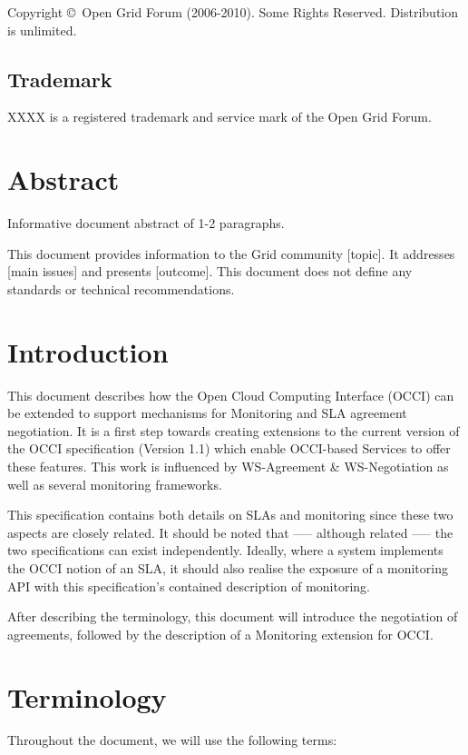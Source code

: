 \documentclass[12pt]{article}  %
\newcommand{\copyrightyears}{2006-2010}  %
\begin{document}
Copyright \copyright \ Open Grid Forum (\copyrightyears).  Some Rights Reserved.  
Distribution is unlimited.

\subsection*{Trademark}

XXXX is a registered trademark and service mark of the Open Grid Forum. 

\section*{Abstract}

Informative document abstract of 1-2 paragraphs.

This document provides information to the Grid community [topic].
It addresses [main issues] and presents [outcome].
This document does not define any standards or technical recommendations.

\tableofcontents

\newpage


\section{Introduction}
This document describes how the Open Cloud Computing Interface (OCCI) can be extended to support mechanisms for Monitoring and SLA agreement negotiation. It is a first step towards creating extensions to the current version of the OCCI specification (Version 1.1) which enable OCCI-based Services to offer these features. This work is influenced by WS-Agreement \& WS-Negotiation as well as several monitoring frameworks.


This specification contains both details on SLAs and monitoring since these two aspects are closely related. It should be noted that —-- although related —-- the two specifications can exist independently. Ideally, where a system implements the OCCI notion of an SLA, it should also realise the exposure of a monitoring API with this specification’s contained description of monitoring.


After describing the terminology, this document will introduce the negotiation of agreements, followed by the description of a Monitoring extension for OCCI.
\section{Terminology}
Throughout the document, we will use the following terms:
\end{document}
